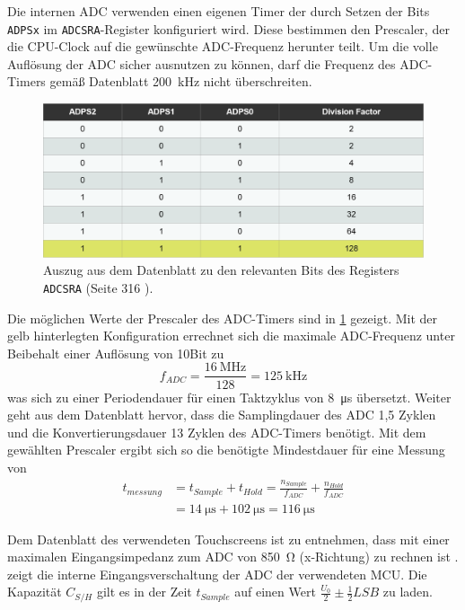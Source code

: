 		Die internen ADC verwenden einen eigenen Timer der durch Setzen der Bits \texttt{ADPSx} im \texttt{ADCSRA}-Register konfiguriert wird.
		Diese bestimmen den Prescaler, der die CPU-Clock auf die gewünschte ADC-Frequenz herunter teilt.
		Um die volle Auflösung der ADC sicher ausnutzen zu können, darf die Frequenz des ADC-Timers gemäß Datenblatt \SI{200}{\kilo\hertz} nicht überschreiten.
		\begin{figure}[h]
			\centering
			\includegraphics[width=.9\textwidth]{fig/raster/ADC-Timer_Config.png}
			\caption[Auszug aus dem Datenblatt zu den relevanten Bits des Registers \texttt{ADCSRA}]{Auszug aus dem Datenblatt zu den relevanten Bits des Registers \texttt{ADCSRA} (Seite 316 \cite{MicrochipTechnologyInc.ATmega32U4.Datasheet.2016}).}
			\label{fig:adc timer konfig}
		\end{figure}
		Die möglichen Werte der Prescaler des ADC-Timers sind in \cref{fig:adc timer konfig} gezeigt.
		Mit der gelb hinterlegten Konfiguration errechnet sich die maximale ADC-Frequenz unter Beibehalt einer Auflösung von 10Bit zu
		\begin{equation}
			f_{ADC} = \frac{\SI{16}{\mega\hertz}}{128} = \SI{125}{\kilo\hertz}
			\label{eq:adc timer}
		\end{equation}
		was sich zu einer Periodendauer für einen Taktzyklus von \SI{8}{\micro\second} übersetzt.
		Weiter geht aus dem Datenblatt hervor, dass die Samplingdauer des ADC 1,5 Zyklen und die Konvertierungsdauer 13 Zyklen des ADC-Timers benötigt.
		Mit dem gewählten Prescaler ergibt sich so die benötigte Mindestdauer für eine Messung von
		\begin{align}
			t_{messung} &= t_{Sample} + t_{Hold} = \frac{n_{Sample}}{f_{ADC}} + \frac{n_{Hold}}{f_{ADC}} \nonumber \\
						&= \SI{14}{\micro\second} + \SI{102}{\micro\second} = \SI{116}{\micro\second}
			\label{eq:adc messdauer}
		\end{align}

		Dem Datenblatt des verwendeten Touchscreens ist zu entnehmen, dass mit einer maximalen Eingangsimpedanz zum ADC von \SI{850}{\ohm} (x-Richtung) zu rechnen ist \cite{FUJITSU.touchscreen.datasheet}.
		 zeigt die interne Eingangsverschaltung der ADC der verwendeten MCU. Die Kapazität \(C_{S/H}\) gilt es in der Zeit \(t_{Sample}\) auf einen Wert \(\frac{U_0}{2} \pm \frac{1}{2}LSB\) zu laden.

